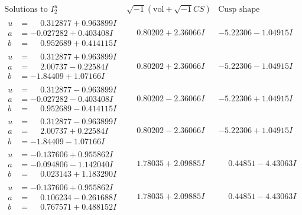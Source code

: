 \documentclass[1p]{elsarticle_modified}
\theoremstyle{definition}
\newcommand{\I}{\sqrt{-1}}
\begin{document}
$$\begin{array}{c|c|c}  
\text{Solutions to }I^u_{2}& \I (\text{vol} + \sqrt{-1}CS) & \text{Cusp shape}\\
 \hline 
\begin{aligned}
u &= \phantom{-}0.312877 + 0.963899 I \\
a &= -0.027282 + 0.403408 I \\
b &= \phantom{-}0.952689 + 0.414115 I\end{aligned}
 & \phantom{-}0.80202 + 2.36066 I & -5.22306 - 1.04915 I \\ \hline\begin{aligned}
u &= \phantom{-}0.312877 + 0.963899 I \\
a &= \phantom{-}2.00737 - 0.22584 I \\
b &= -1.84409 + 1.07166 I\end{aligned}
 & \phantom{-}0.80202 + 2.36066 I & -5.22306 - 1.04915 I \\ \hline\begin{aligned}
u &= \phantom{-}0.312877 - 0.963899 I \\
a &= -0.027282 - 0.403408 I \\
b &= \phantom{-}0.952689 - 0.414115 I\end{aligned}
 & \phantom{-}0.80202 - 2.36066 I & -5.22306 + 1.04915 I \\ \hline\begin{aligned}
u &= \phantom{-}0.312877 - 0.963899 I \\
a &= \phantom{-}2.00737 + 0.22584 I \\
b &= -1.84409 - 1.07166 I\end{aligned}
 & \phantom{-}0.80202 - 2.36066 I & -5.22306 + 1.04915 I \\ \hline\begin{aligned}
u &= -0.137606 + 0.955862 I \\
a &= -0.094806 - 1.142040 I \\
b &= \phantom{-}0.023143 + 1.183290 I\end{aligned}
 & \phantom{-}1.78035 + 2.09885 I & \phantom{-}0.44851 - 4.43063 I \\ \hline\begin{aligned}
u &= -0.137606 + 0.955862 I \\
a &= \phantom{-}0.106234 - 0.261688 I \\
b &= \phantom{-}0.767571 + 0.488152 I\end{aligned}
 & \phantom{-}1.78035 + 2.09885 I & \phantom{-}0.44851 - 4.43063 I \\ \hline\begin{aligned}

\end{aligned}
\end{array}$$
\end{document}
